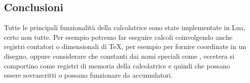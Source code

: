 \subsection{Conclusioni}

Tutte le principali funzionalità della calcolatrice sono state implementate in
Lua, certo non tutte. Per esempio potremo far eseguire calcoli coinvolgendo
anche registri contatori o dimensionali di \TeX{}, per esempio per fornire
coordinate in un disegno, oppure considerare che constanti dai nomi speciali
come ,  eccetera si comportino come registri di memoria della
calcolatrice e quindi che possano essere sovrascritti o possano funzionare da
accumulatori.

